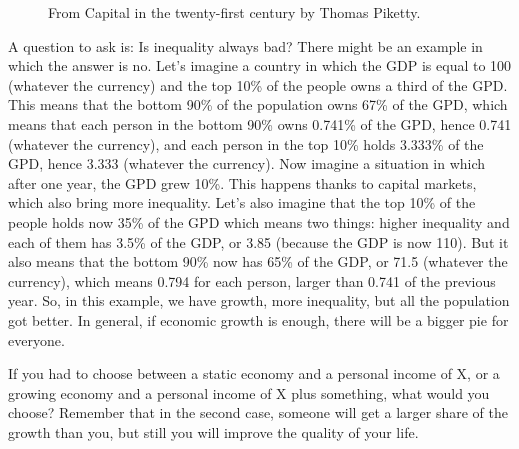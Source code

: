\begin{figure}
    \caption{From Capital in the twenty-first century by Thomas Piketty.}
    \label{fig:income_ineq}
\end{figure}

A question to ask is: Is inequality always bad? There might be an example in which the answer is no.
Let's imagine a country in which the GDP is equal to 100 (whatever the currency) and the top 10\% of the people owns a third of the GPD. This means that the bottom 90\% of the population owns 67\% of the GPD, which means that each person in the bottom 90\% owns 0.741\% of the GPD, hence 0.741 (whatever the currency), and each person in the top 10\% holds 3.333\% of the GPD, hence 3.333 (whatever the currency). Now imagine a situation in which after one year, the GPD grew 10\%. This happens thanks to capital markets, which also bring more inequality. Let's also imagine that the top 10\% of the people holds now 35\% of the GPD which means two things: higher inequality and each of them has 3.5\% of the GDP, or 3.85 (because the GDP is now 110). But it also means that the bottom 90\% now has 65\% of the GDP, or 71.5 (whatever the currency), which means 0.794 for each person, larger than 0.741 of the previous year. So, in this example, we have growth, more inequality, but all the population got better. In general, if economic growth is enough, there will be a bigger pie for everyone. 

If you had to choose between a static economy and a personal income of X, or a growing economy and a personal income of X plus something, what would you choose? Remember that in the second case, someone will get a larger share of the growth than you, but still you will improve the quality of your life.

